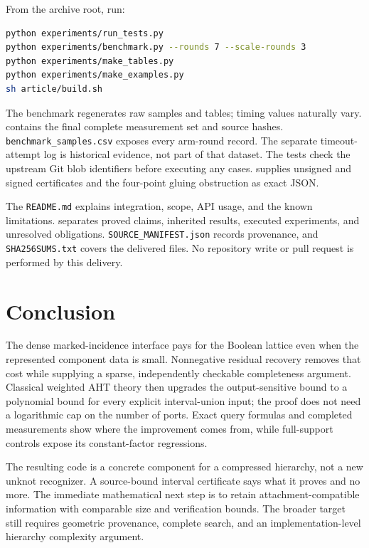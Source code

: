 \documentclass[11pt,letterpaper]{article}
\theoremstyle{definition}
\newcommand{\code}[1]{\texttt{#1}}
\begin{document}
From the archive root, run:
\begin{lstlisting}[language=bash]
python experiments/run_tests.py
python experiments/benchmark.py --rounds 7 --scale-rounds 3
python experiments/make_tables.py
python experiments/make_examples.py
sh article/build.sh
\end{lstlisting}
The benchmark regenerates raw samples and tables; timing values naturally
vary.  contains the final complete measurement
set and source hashes. \code{benchmark\_samples.csv} exposes every arm-round
record. The separate timeout-attempt log is historical evidence, not part
of that dataset. The tests check the upstream Git blob identifiers before
executing any cases.  supplies unsigned and signed
certificates and the four-point gluing obstruction as exact JSON.

The \code{README.md} explains integration, scope, API usage, and the
known limitations.  separates proved claims,
inherited results, executed experiments, and unresolved obligations.
\code{SOURCE\_MANIFEST.json} records provenance, and
\code{SHA256SUMS.txt} covers the delivered files. No repository write or
pull request is performed by this delivery.

\section{Conclusion}
The dense marked-incidence interface pays for the Boolean lattice even
when the represented component data is small. Nonnegative residual
recovery removes that cost while supplying a sparse, independently
checkable completeness argument. Classical weighted AHT theory then
upgrades the output-sensitive bound to a polynomial bound for every
explicit interval-union input; the proof does not need a logarithmic cap
on the number of ports. Exact query formulas and completed measurements
show where the improvement comes from, while full-support controls expose
its constant-factor regressions.

The resulting code is a concrete component for a compressed hierarchy,
not a new unknot recognizer. A source-bound interval certificate says what
it proves and no more. The immediate mathematical next step is to retain
attachment-compatible information with comparable size and verification
bounds. The broader target still requires geometric provenance, complete
search, and an implementation-level hierarchy complexity argument.
\end{document}
